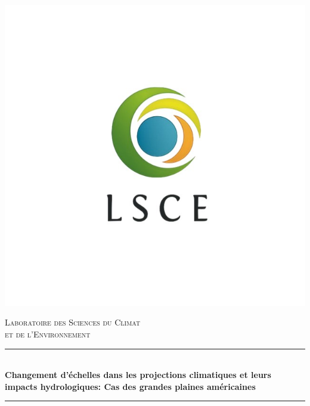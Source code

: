 \documentclass[a4paper,11pt]{article}
\numberwithin{equation}{section}
\begin{document}
	\begin{center}
			\includegraphics[scale=0.5]{images/LSCE.jpg}
	\end{center}
	\hypersetup{pdfborder=0 0 0}
	\newcommand{\HRule}{\rule{\linewidth}{0.5mm}}
	\begin{center}
		\textsc{\LARGE Laboratoire des Sciences du Climat} \\[0.3cm]
		\textsc{\LARGE et de l'Environnement}\\[1.5cm] 
		\HRule \\[0.5cm]
		{\huge \bfseries Changement d’échelles dans les projections climatiques et leurs impacts hydrologiques: Cas des grandes plaines américaines}\\[0.4cm] 
		\HRule \\[1.5cm]
	\end{center}
\end{document}
